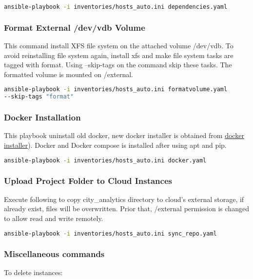 \begin{lstlisting}[language=bash]
ansible-playbook -i inventories/hosts_auto.ini dependencies.yaml
\end{lstlisting}

\subsubsection{Format External /dev/vdb Volume}
This command install XFS file system on the attached volume /dev/vdb. To avoid reinstalling file system again, install xfs and make file system tasks are tagged with format. Using --skip-tags on the command skip these tasks. The formatted volume is mounted on /external. 

\begin{lstlisting}[language=bash]
ansible-playbook -i inventories/hosts_auto.ini formatvolume.yaml
--skip-tags "format"
\end{lstlisting}

\subsubsection{Docker Installation}
This playbook uninstall old docker, new docker installer is obtained from \href{https://download.docker.com/linux/ubuntu/gpg}{docker installer}). Docker and Docker compose is installed after using apt and pip.

\begin{lstlisting}[language=bash]
ansible-playbook -i inventories/hosts_auto.ini docker.yaml
\end{lstlisting}

\subsubsection{Upload Project Folder to Cloud Instances}
Execute following to copy city\_analytics directory to cloud's external storage, if already exist, files will be overwritten. Prior that, /external permission is changed to allow read and write remotely. 

\begin{lstlisting}[language=bash]
ansible-playbook -i inventories/hosts_auto.ini sync_repo.yaml
\end{lstlisting}

\subsubsection{Miscellaneous commands}
To delete instances:  

